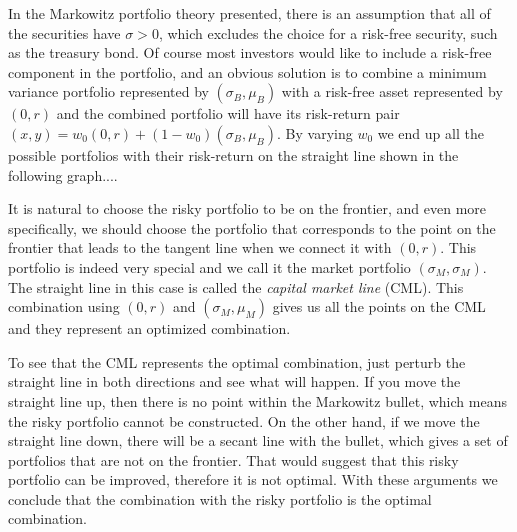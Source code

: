 In the Markowitz portfolio theory presented, there is an assumption that all of the securities have $\sigma > 0$, which excludes the choice for a risk-free security, such
as the treasury bond. Of course most investors would like to include a risk-free component in the portfolio, and an obvious solution is to combine a minimum
variance portfolio represented by $(\sigma_B, \mu_B)$ with a risk-free asset represented by $(0, r)$ and the combined portfolio will have its risk-return pair
$(x, y) = w_0(0, r) + (1 − w_0)(\sigma_B, \mu_B)$.
By varying $w_0$ we end up all the possible portfolios with their risk-return on the straight line shown in the following graph....

It is natural to choose the risky portfolio to be on the frontier, and even more specifically, we should choose the portfolio that corresponds to the point on the
frontier that leads to the tangent line when we connect it with $(0, r)$. This portfolio is indeed very special and we call it the market portfolio $(\sigma_M, \sigma_M)$.
The straight line in this case is called the \emph{capital market line} (CML). This combination using $(0, r)$ and $(\sigma_M, \mu_M)$ gives us all the points on the CML and they represent an optimized combination.

To see that the CML represents the optimal combination, just perturb the straight line in both directions and see what will happen. If you move the straight line up, then there is no point within the Markowitz bullet, which means the risky portfolio cannot be constructed. On the other hand, if we move the straight line down, there will be a secant line with the bullet, which gives a set of portfolios that are not on the frontier. That would suggest that this risky portfolio can be improved, therefore it is not optimal. With these arguments we conclude that the combination with the risky portfolio is the optimal combination.


